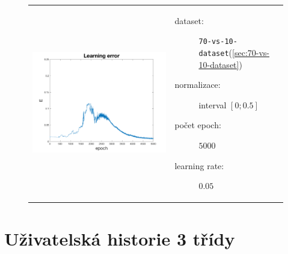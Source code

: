 \documentclass[thesis=M,czech]{FITthesis}[2012/06/26]
\begin{document}
\begin{figure}[htbp]
\begin{tabular}{p{}p{}}
    \begin{minipage}{.5\textwidth}
    \centering
    \includegraphics[scale=0.3]{err_70-vs-10.png}
    \label{fig:fig1}
    \end{minipage}
    &
    \begin{minipage}{.5\textwidth}
		\begin{description}
            \item[dataset:] \texttt{70-vs-10-dataset}(\ref{sec:70-vs-10-dataset})
            \item[normalizace:] interval $[0;0.5]$
            \item[počet epoch:] $5000$
            \item[learning rate:] $0.05$
        \end{description}
\end{minipage}
\end{tabular}
\end{figure}

\section{Uživatelská historie 3 třídy}\label{exp:user1}
\end{document}
